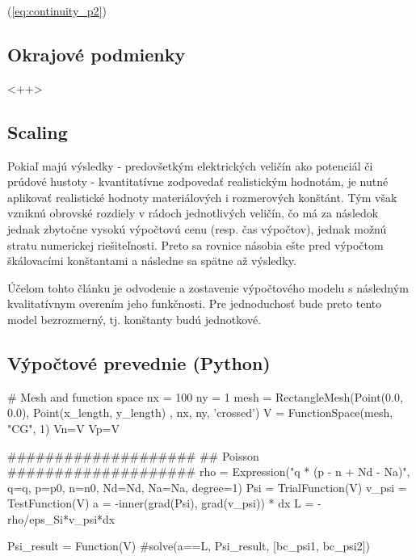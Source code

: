 \documentclass[a4paper, twoside, 12pt, onecolumn]{article}
\begin{document}
(\ref{eq:continuity_p2})
 
\subsection{Okrajové podmienky}<++>
\subsection{Scaling}
Pokiaľ majú výsledky - predovšetkým elektrických veličín ako potenciál či prúdové hustoty - kvantitatívne zodpovedať realistickým hodnotám, je nutné aplikovať realistické hodnoty materiálových i rozmerových konštánt. Tým však vzniknú obrovské rozdiely v rádoch jednotlivých veličín, čo má za následok jednak zbytočne vysokú výpočtovú cenu (resp. čas výpočtov), jednak možnú stratu numerickej riešiteľnosti. Preto sa rovnice násobia ešte pred výpočtom škálovacími konštantami \cite{selberherr} \cite{de_mari} a následne sa spätne  až výsledky.

Účelom tohto článku je odvodenie a zostavenie výpočtového modelu s následným kvalitatívnym overením jeho funkčnosti. Pre jednoduchosť bude preto tento model bezrozmerný, tj. konštanty budú jednotkové.
\subsection{Výpočtové prevednie (Python)}


\begin{mycode1}
# Mesh and function space
nx = 100
ny = 1
mesh = RectangleMesh(Point(0.0, 0.0), Point(x_length, y_length) , nx, ny, 'crossed')
V = FunctionSpace(mesh, "CG", 1)
Vn=V
Vp=V
\end{mycode1}

\begin{mycode1}
####################
## Poisson
####################
rho = Expression("q * (p - n + Nd - Na)", q=q, p=p0, n=n0, Nd=Nd, Na=Na, degree=1)
Psi = TrialFunction(V)
v_psi = TestFunction(V)
a = -inner(grad(Psi), grad(v_psi)) * dx
L = -rho/eps_Si*v_psi*dx

Psi_result = Function(V)
#solve(a==L, Psi_result, [bc_psi1, bc_psi2])
\end{mycode1}
\end{document}
